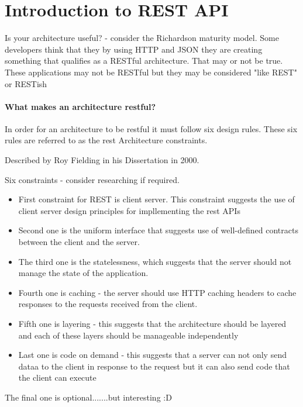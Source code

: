 \section{Introduction to REST API}

Is your architecture useful? - consider the Richardson maturity model.
Some developers think that they by using HTTP and JSON they are creating something that qualifies as a RESTful architecture.
That may or not be true.
These applications may not be RESTful but they may be considered "like REST" or RESTish

\paragraph{What makes an architecture restful?}
In order for an architecture to be restful it must follow six design rules.
These six rules are referred to as the rest Architecture constraints.

\begin{note}
    Described by Roy Fielding in his Dissertation in 2000.
\end{note}

Six constraints - consider researching if required.
\begin{itemize}
    \item First constraint for REST is client server. This constraint suggests the use of client server design principles for impllementing the rest APIs
    \item Second one is the uniform interface that suggests use of well-defined contracts between the client and the server.
    \item The third one is the statelessness, which suggests that the server should not manage the state of the application.
    \item Fourth one is caching - the server should use HTTP caching headers to cache responses to the requests received from the client.
    \item Fifth one is layering - this suggests that the architecture should be layered and each of these layers should be manageable independently
    \item Last one is code on demand - this suggests that a server can not only send dataa to the client in response to the request but it can also send code that the client can execute
\end{itemize}

\begin{note}
    The final one is optional.......but interesting :D
\end{note}

